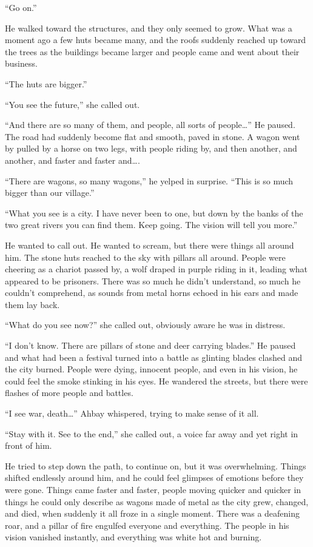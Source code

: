 ``Go on.''

He walked toward the structures, and they only seemed to grow. What was a moment ago a few huts became many, and the roofs suddenly reached up toward the trees as the buildings became larger and people came and went about their business.

``The huts are bigger.''

``You see the future,'' she called out.

``And there are so many of them, and people, all sorts of people\ldots'' He paused. The road had suddenly become flat and smooth, paved in stone. A wagon went by pulled by a horse on two legs, with people riding by, and then another, and another, and faster and faster and\ldots.

``There are wagons, so many wagons,'' he yelped in surprise. ``This is so much bigger than our village.''

``What you see is a city. I have never been to one, but down by the banks of the two great rivers you can find them. Keep going. The vision will tell you more.''

He wanted to call out. He wanted to scream, but there were things all around him. The stone huts reached to the sky with pillars all around. People were cheering as a chariot passed by, a wolf draped in purple riding in it, leading what appeared to be prisoners. There was so much he didn't understand, so much he couldn't comprehend, as sounds from metal horns echoed in his ears and made them lay back.

``What do you see now?'' she called out, obviously aware he was in distress.

``I don't know. There are pillars of stone and deer carrying blades.'' He paused and what had been a festival turned into a battle as glinting blades clashed and the city burned. People were dying, innocent people, and even in his vision, he could feel the smoke stinking in his eyes. He wandered the streets, but there were flashes of more people and battles.

``I see war, death\ldots'' Ahbay whispered, trying to make sense of it all.

``Stay with it. See to the end,'' she called out, a voice far away and yet right in front of him.

He tried to step down the path, to continue on, but it was overwhelming. Things shifted endlessly around him, and he could feel glimpses of emotions before they were gone. Things came faster and faster, people moving quicker and quicker in things he could only describe as wagons made of metal as the city grew, changed, and died, when suddenly it all froze in a single moment. There was a deafening roar, and a pillar of fire engulfed everyone and everything. The people in his vision vanished instantly, and everything was white hot and burning.


